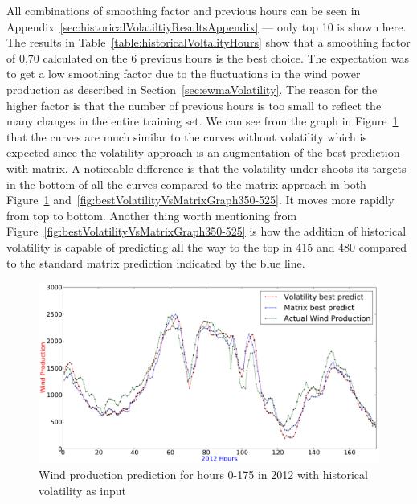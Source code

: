 All combinations of smoothing factor and previous hours can be seen in Appendix~\ref{sec:historicalVolatiltiyResultsAppendix} --- only top 10 is shown here. The results in Table~\ref{table:historicalVoltalityHours} show that a smoothing factor of 0,70 calculated on the 6 previous hours is the best choice. The expectation was to get a low smoothing factor due to the fluctuations in the wind power production as described in Section~\ref{sec:ewmaVolatility}. The reason for the higher factor is that the number of previous hours is too small to reflect the many changes in the entire training set. We can see from the graph in Figure~\ref{fig:bestVolatilityVsMatrixGraph} that the curves are much similar to the curves without volatility which is expected since the volatility approach is an augmentation of the best prediction with matrix. A noticeable difference is that the volatility under-shoots  its targets in the bottom of all the curves compared to the matrix approach in both Figure~\ref{fig:bestVolatilityVsMatrixGraph} and~\ref{fig:bestVolatilityVsMatrixGraph350-525}. It moves more rapidly from top to bottom. Another thing worth mentioning from Figure~\ref{fig:bestVolatilityVsMatrixGraph350-525} is how the addition of historical volatility is capable of predicting all the way to the top in 415 and 480 compared to the standard matrix prediction indicated by the blue line.

\begin{figure}[H]
\centering
\includegraphics[width=0.99\linewidth]{billeder/bestVolatilityVsMatrixGraph.png}
\caption{Wind production prediction for hours 0-175 in 2012 with historical volatility as input}
\label{fig:bestVolatilityVsMatrixGraph}
\end{figure} 

